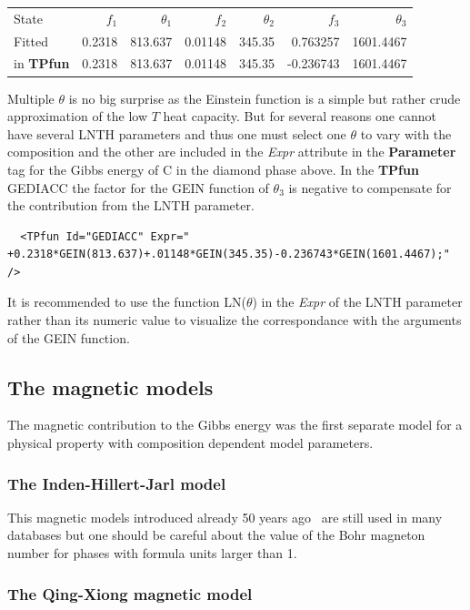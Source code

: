 \documentclass{article}
\begin{document}
\begin{tabular}{lrrrrrr}
State  & $f_1$   & $\theta_1$ & $f_2$   & $\theta_2$ & $f_3$  & $\theta_3$ \\
Fitted &  0.2318 & 813.637 & 0.01148 & 345.35 & 0.763257 & 1601.4467\\
in {\bf TPfun} &  0.2318 & 813.637 & 0.01148 & 345.35 & -0.236743 & 1601.4467\\
\end{tabular}

Multiple $\theta$ is no big surprise as the Einstein function is a
simple but rather crude approximation of the low $T$ heat capacity.
But for several reasons one cannot have several LNTH parameters and
thus one must select one $\theta$ to vary with the composition and the
other are included in the {\em Expr} attribute in the {\bf Parameter}
tag for the Gibbs energy of C in the diamond phase above.  In the {\bf
  TPfun} GEDIACC the factor for the GEIN function of $\theta_3$ is
negative to compensate for the contribution from the LNTH parameter.

\begin{verbatim}
  <TPfun Id="GEDIACC" Expr=" +0.2318*GEIN(813.637)+.01148*GEIN(345.35)-0.236743*GEIN(1601.4467);" /> 
\end{verbatim}

It is recommended to use the function LN($\theta$) in the {\em Expr}
of the LNTH parameter rather than its numeric value to visualize the
correspondance with the arguments of the GEIN function.

\subsection{The magnetic models}\label{sec:ihj}

The magnetic contribution to the Gibbs energy was the first separate
model for a physical property with composition dependent model
parameters.

\subsubsection{The Inden-Hillert-Jarl model}\label{sec:ihjhs}

This magnetic models introduced already 50 years ago~\cite{78Hil,
  82Her} are still used in many databases but one should be careful
about the value of the Bohr magneton number for phases with formula
units larger than 1.

\subsubsection{The Qing-Xiong magnetic model}\label{sec:qxmag}
\end{document}
